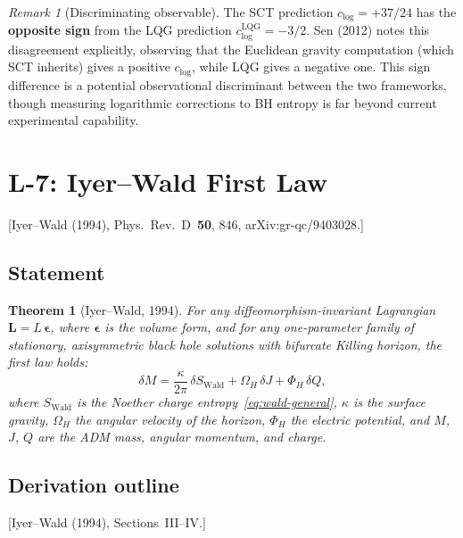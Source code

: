 \documentclass[12pt,a4paper]{article}
\newtheorem{theorem}[proposition]{Theorem}
\theoremstyle{definition}
\theoremstyle{remark}
\newtheorem{remark}[proposition]{Remark}
\newcommand{\fromlit}[1]{\textcolor{blue!70!black}{\textsf{[#1]}}}
\begin{document}
\begin{remark}[Discriminating observable]
The SCT prediction $c_{\log} = +37/24$ has the \textbf{opposite sign}
from the LQG prediction $c_{\log}^{\mathrm{LQG}} = -3/2$.
Sen (2012) notes this disagreement explicitly, observing that the
Euclidean gravity computation (which SCT inherits) gives a positive
$c_{\log}$, while LQG gives a negative one.  This sign difference
is a potential observational discriminant between the two frameworks,
though measuring logarithmic corrections to BH entropy is far beyond
current experimental capability.
\end{remark}


\section{L-7: Iyer--Wald First Law}
\label{sec:L7}

\fromlit{Iyer--Wald (1994), Phys.\ Rev.\ D~\textbf{50}, 846,
arXiv:gr-qc/9403028.}

\subsection{Statement}

\begin{theorem}[Iyer--Wald, 1994]\label{thm:iyer-wald}
For any diffeomorphism-invariant Lagrangian
$\mathbf{L} = L\,\boldsymbol{\epsilon}$, where
$\boldsymbol{\epsilon}$ is the volume form, and for any
one-parameter family of stationary, axisymmetric black hole
solutions with bifurcate Killing horizon, the first law holds:
\begin{equation}\label{eq:first-law}
  \boxed{
  \delta M = \frac{\kappa}{2\pi}\,\delta S_{\mathrm{Wald}}
  + \Omega_H\,\delta J + \Phi_H\,\delta Q,}
\end{equation}
where $S_{\mathrm{Wald}}$ is the Noether charge entropy~\eqref{eq:wald-general}, $\kappa$ is the surface gravity, $\Omega_H$
the angular velocity of the horizon, $\Phi_H$ the electric
potential, and $M$, $J$, $Q$ are the ADM mass, angular momentum,
and charge.
\end{theorem}

\subsection{Derivation outline}
\fromlit{Iyer--Wald (1994), Sections~III--IV.}
\end{document}
